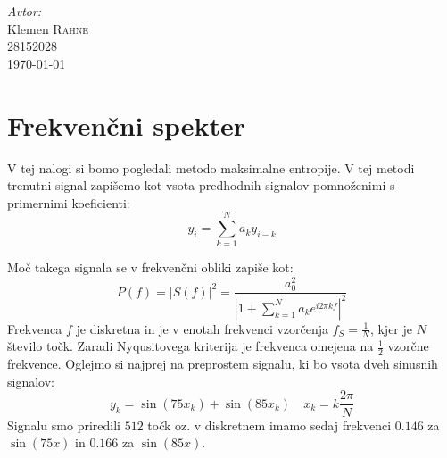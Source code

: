 \documentclass[slovene,11pt,a4paper]{article}
\numberwithin{equation}{section} %
\numberwithin{figure}{section} %
\numberwithin{table}{section} %
\begin{document}
\begin{titlepage}



\Large \emph{Avtor:}\\
Klemen \textsc{Rahne}\\
28152028\\[2cm]

{\large \today } \\[0.5cm] %

	

\end{titlepage}






\section{Frekvenčni spekter}
V tej nalogi si bomo pogledali metodo maksimalne entropije. V tej metodi trenutni signal zapišemo kot vsota predhodnih signalov pomnoženimi s primernimi koeficienti:
\begin{equation}
y_i=\sum_{k=1}^{N} a_k y_{i-k}
\end{equation}

Moč takega signala se v frekvenčni obliki zapiše kot:
\begin{equation}
P(f)=|S(f)|^2=\frac{a_0^2}{|1+\sum_{k=1}^N a_k e^{i 2 \pi k f}|^2}
\end{equation}
Frekvenca $f$ je diskretna in je v enotah frekvenci vzorčenja $f_S=\frac{1}{N}$, kjer je $N$ število točk. Zaradi Nyqusitovega kriterija je frekvenca omejena na $\frac{1}{2}$ vzorčne frekvence. Oglejmo si najprej na preprostem signalu, ki bo vsota dveh sinusnih signalov:
\begin{equation}
\label{eq-signal1}
y_k= \sin(75 x_k) + \sin( 85 x_k) \quad x_k= k \frac{2 \pi}{N}
\end{equation}
Signalu smo priredili $512$ točk oz. v diskretnem imamo sedaj frekvenci $0.146$ za $\sin(75x)$ in $0.166$ za $\sin(85x)$.
\end{document}
